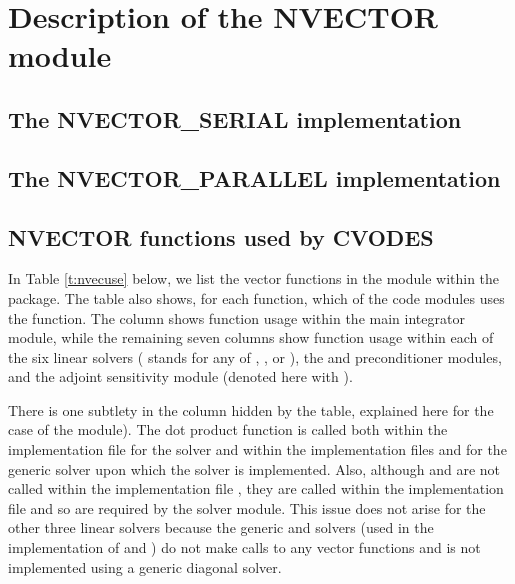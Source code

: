 \chapter{Description of the NVECTOR module}\label{s:nvector}


\section{The NVECTOR\_SERIAL implementation}\label{ss:nvec_ser}


\section{The NVECTOR\_PARALLEL implementation}\label{ss:nvec_par}


\section{NVECTOR functions used by CVODES}

In Table \ref{t:nvecuse} below, we list the vector functions in the 
{\nvector} module within the {\cvodes} package.
The table also shows, for each function, which of the code modules uses
the function. The {\cvodes} column shows function usage within the main
integrator module, while the remaining seven columns show function usage
within each of the six {\cvodes} linear solvers ({\cvspils} stands for any
of {\cvspgmr}, {\cvspbcg}, or {\cvsptfqmr}), the {\cvbandpre} and
{\cvbbdpre} preconditioner modules, and the {\cvodes} adjoint sensitivity
module (denoted here with {\cvodea}).

There is one subtlety in the {\cvspils} column hidden by the table, explained
here for the case of the {\cvspgmr} module).
The dot product function  is called both within the 
implementation file  for the {\cvspgmr} solver and within 
the implementation files  and  for the generic
{\spgmr} solver upon which the {\cvspgmr} solver is implemented. Also, although
 and  are not called within the implementation file
, they are called within the implementation file
 and so are required by the {\cvspgmr} solver module.
This issue does not arise for the other 
three {\cvodes} linear solvers because the generic {\dense} and {\band} solvers 
(used in the implementation of {\cvdense} and {\cvband}) do not make calls to 
any vector functions and {\cvdiag} is not implemented using a generic diagonal solver. 

